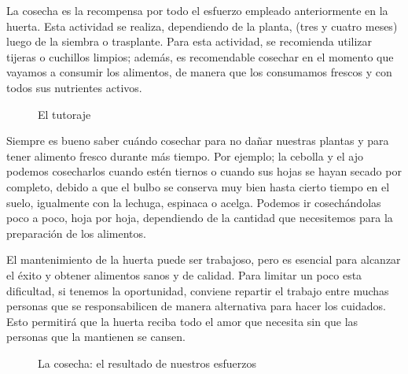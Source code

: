 \documentclass[../main.tex]{subfiles}
\begin{document}
La cosecha es la recompensa por todo el esfuerzo empleado anteriormente en la huerta. Esta actividad se realiza, dependiendo de la planta,  (tres y cuatro meses) luego de la siembra o trasplante. Para esta actividad, se recomienda utilizar tijeras o cuchillos limpios; además, es recomendable cosechar en el momento que vayamos a consumir los alimentos, de manera que los consumamos frescos y con todos sus nutrientes activos.\\

\begin{wrapfigure}[10]{i}[0cm]{0.45\textwidth}
    \centering
    \caption*{\color{CompostGreen!50!black}El tutoraje}
    \label{tutoraje1}
\end{wrapfigure}

Siempre es bueno saber cuándo cosechar para no dañar nuestras plantas y para tener alimento fresco durante más tiempo. Por ejemplo; la cebolla y el ajo podemos cosecharlos cuando estén tiernos o cuando sus hojas se hayan secado por completo, debido a que el bulbo se conserva muy bien hasta cierto tiempo en el suelo, igualmente con la lechuga, espinaca o acelga. Podemos ir cosechándolas poco a poco, hoja por hoja, dependiendo de la cantidad que necesitemos para la preparación de los alimentos.

\begin{recuadroR}
    El mantenimiento de la huerta puede ser trabajoso, pero es esencial para alcanzar el éxito y obtener alimentos sanos y de calidad. Para limitar un poco esta dificultad, si tenemos la oportunidad, conviene repartir el trabajo entre muchas personas que se responsabilicen de manera alternativa para hacer los cuidados. Esto permitirá que la huerta reciba todo el amor que necesita sin que las personas que la mantienen se cansen.
\end{recuadroR}

\vfill

\begin{figure}[H]
    \centering
    \caption*{\color{CompostGreen!50!black}La cosecha: el resultado de nuestros esfuerzos}
    \label{cosecha1}
\end{figure}


\vfill

\pagebreak
\end{document}
